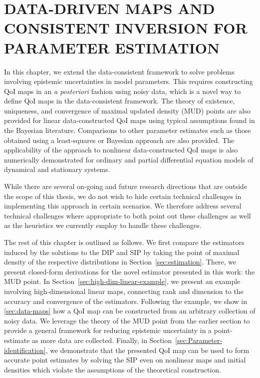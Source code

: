 \chapter{\uppercase{Data-Driven Maps and Consistent Inversion For Parameter Estimation} \label{chapter:mud}}

In this chapter, we extend the data-consistent framework to solve problems involving epistemic uncertainties in model parameters.
This requires constructing QoI maps in an {\em a posteriori} fashion using noisy data, which is a novel way to define QoI maps in the data-consistent framework.
The theory of existence, uniqueness, and convergence of maximal updated density (MUD) points are also provided for linear data-constructed QoI maps using typical assumptions found in the Bayesian literature.
Comparisons to other parameter estimates such as those obtained using a least-squares or Bayesian approach are also provided.
The applicability of the approach to nonlinear data-constructed QoI maps is also numerically demonstrated for ordinary and partial differential equation models of dynamical and stationary systems.

While there are several on-going and future research directions that are outside the scope of this thesis, we do not wish to hide certain technical challenges in implementing this approach in certain scenarios.
We therefore address several technical challenges where appropriate to both point out these challenges as well as the heuristics we currently employ to handle these challenges.


The rest of this chapter is outlined as follows.
We first compare the estimators induced by the solutions to the DIP and SIP by taking the point of maximal density of the respective distributions in Section~\ref{sec:estimation}.
There, we present closed-form derivations for the novel estimator presented in this work: the MUD point.
In Section~\ref{sec:high-dim-linear-example}, we present an example involving high-dimensional linear maps, connecting rank and dimension to the accuracy and convergence of the estimators.
Following the example, we show in \ref{sec:data-maps} how a QoI map can be constructed from an arbitrary collection of noisy data.
We leverage the theory of the MUD point from the earlier section to provide a general framework for reducing epistemic uncertainty in a point-estimate as more data are collected.
Finally, in Section~\ref{sec:Parameter-identification}, we demonstrate that the presented QoI map can be used to form accurate point estimates by solving the SIP even on nonlinear maps and initial densities which violate the assumptions of the theoretical construction.


